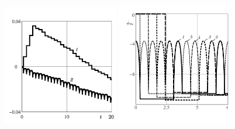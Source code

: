 \begin{figure}[H]
  \includegraphics[width=0.45\textwidth]{pic/figure6_1.png}
  \includegraphics[width=0.45\textwidth]{pic/figure6_2.pdf}
  \caption{\ }
  \label{fig:straight}
\end{figure}

